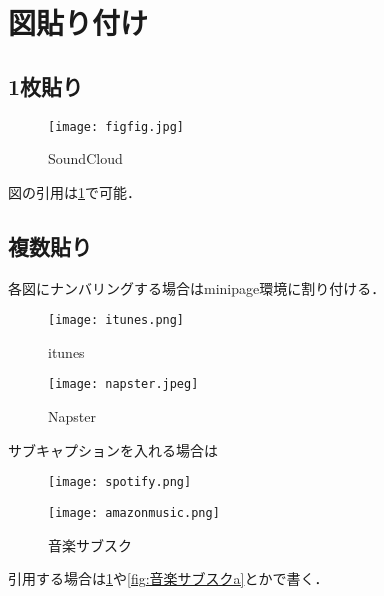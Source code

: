 \documentclass[12pt,a4paper,onecolumn]{jsreport}
\begin{document}
\clearpage
\section{図貼り付け}
\subsection{1枚貼り}
\begin{figure}[h]
    \centering
    \texttt{[image: figfig.jpg]}
    \caption{SoundCloud}
    \label{fig1}
\end{figure}
図の引用は\cref{fig1}で可能．

\subsection{複数貼り}
各図にナンバリングする場合はminipage環境に割り付ける．

\begin{figure}[h]
    \begin{minipage}[h]{0.45\linewidth}
        \centering
        \texttt{[image: itunes.png]}
        \caption{itunes}
        \label{fig:itunes}
    \end{minipage}
    \begin{minipage}[h]{0.45\linewidth}
        \centering
        \texttt{[image: napster.jpeg]}
        \caption{Napster}
        \label{fig:napster}
    \end{minipage}
\end{figure}

サブキャプションを入れる場合は

\begin{figure}[h]
    \begin{minipage}[h]{0.45\linewidth}
        \centering
        \texttt{[image: spotify.png]}
        \label{fig:音楽サブスクa}
    \end{minipage}
    \begin{minipage}[h]{0.45\linewidth}
        \centering
        \texttt{[image: amazonmusic.png]}
        \label{fig:音楽サブスクb}
    \end{minipage}
    \caption{音楽サブスク}
    \label{fig:音楽サブスク}
\end{figure}

引用する場合は\cref{fig1}や\cref{fig:音楽サブスクa}とかで書く．
\end{document}

